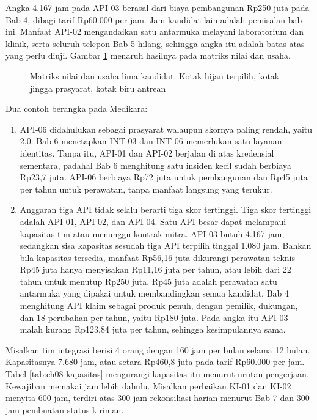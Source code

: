 Angka 4.167 jam pada API-03 berasal dari biaya pembangunan Rp250 juta pada Bab 4, dibagi tarif Rp60.000 per jam. Jam kandidat lain adalah
pemisalan bab ini. Manfaat API-02 mengandaikan satu antarmuka melayani laboratorium dan klinik, serta seluruh telepon Bab 5 hilang,
sehingga angka itu adalah batas atas yang perlu diuji. Gambar \ref{fig:ch08-matriks} menaruh hasilnya pada matriks nilai dan usaha.

\begin{figure}[!htb]
  \centering
  
  \caption{Matriks nilai dan usaha lima kandidat. Kotak hijau terpilih, kotak jingga prasyarat, kotak biru antrean}
  \label{fig:ch08-matriks}
\end{figure}

Dua contoh berangka pada Medikara:
\begin{enumerate}
  \item API-06 didahulukan sebagai prasyarat walaupun skornya paling rendah, yaitu 2,0. Bab 6 menetapkan INT-03 dan INT-06 memerlukan
        satu layanan identitas. Tanpa itu, API-01 dan API-02 berjalan di atas kredensial sementara, padahal Bab 6 menghitung satu insiden
        kecil sudah berbiaya Rp23,7 juta. API-06 berbiaya Rp72 juta untuk pembangunan dan Rp45 juta per tahun untuk perawatan, tanpa
        manfaat langsung yang terukur.
  \item Anggaran tiga API tidak selalu berarti tiga skor tertinggi. Tiga skor tertinggi adalah API-01, API-02, dan API-04. Satu API besar
        dapat melampaui kapasitas tim atau menunggu kontrak mitra. API-03 butuh 4.167 jam, sedangkan sisa kapasitas sesudah tiga API
        terpilih tinggal 1.080 jam. Bahkan bila kapasitas tersedia, manfaat Rp56,16 juta dikurangi perawatan teknis Rp45 juta hanya menyisakan
        Rp11,16 juta per tahun, atau lebih dari 22 tahun untuk menutup Rp250 juta. Rp45 juta adalah perawatan satu antarmuka yang dipakai untuk membandingkan
        semua kandidat. Bab 4 menghitung API klaim sebagai produk penuh, dengan pemilik, dukungan, dan 18 perubahan per tahun, yaitu Rp180 juta. Pada angka itu
        API-03 malah kurang Rp123,84 juta per tahun, sehingga kesimpulannya sama.
\end{enumerate}

Misalkan tim integrasi berisi 4 orang dengan 160 jam per bulan selama 12 bulan. Kapasitasnya 7.680 jam, atau setara Rp460,8 juta pada tarif
Rp60.000 per jam. Tabel \ref{tab:ch08-kapasitas} mengurangi kapasitas itu menurut urutan pengerjaan. Kewajiban memakai jam lebih dahulu.
Misalkan perbaikan KI-01 dan KI-02 menyita 600 jam, terdiri atas 300 jam rekonsiliasi harian menurut Bab 7 dan 300 jam pembuatan status kiriman.


